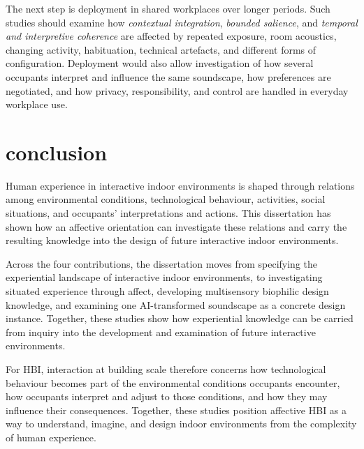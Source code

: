 The next step is deployment in shared workplaces over longer periods.
Such studies should examine how \emph{contextual integration},
\emph{bounded salience}, and \emph{temporal and interpretive coherence}
are affected by repeated exposure, room acoustics, changing activity,
habituation, technical artefacts, and different forms of configuration.
Deployment would also allow investigation of how several occupants
interpret and influence the same soundscape, how preferences are
negotiated, and how privacy, responsibility, and control are handled in
everyday workplace use.

\section{conclusion}
\label{sec:final-conclusion}

Human experience in interactive indoor environments is shaped through
relations among environmental conditions, technological behaviour,
activities, social situations, and occupants' interpretations and
actions. This dissertation has shown how an affective orientation can
investigate these relations and carry the resulting knowledge into
the design of future interactive indoor environments.

Across the four contributions, the dissertation moves from specifying
the experiential landscape of interactive indoor environments, to
investigating situated experience through affect, developing
multisensory biophilic design knowledge, and examining one
AI-transformed soundscape as a concrete design instance. Together, these
studies show how experiential knowledge can be carried from inquiry into
the development and examination of future interactive environments.

For HBI, interaction at building scale therefore concerns how
technological behaviour becomes part of the environmental conditions
occupants encounter, how occupants interpret and adjust to those
conditions, and how they may influence their consequences. Together,
these studies position affective HBI as a way to understand, imagine,
and design indoor environments from the complexity of human experience.







